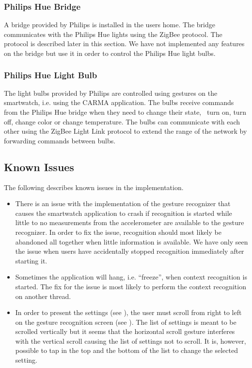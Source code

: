 \subsubsection{Philips Hue Bridge}

A bridge provided by Philips is installed in the users home. The bridge communicates with the Philips Hue lights using the ZigBee protocol. The protocol is described later in this section. We have not implemented any features on the bridge but use it in order to control the Philips Hue light bulbs.

\subsubsection{Philips Hue Light Bulb}

The light bulbs provided by Philips are controlled using gestures on the smartwatch, i.e. using the CARMA application. The bulbs receive commands from the Philips Hue bridge when they need to change their state, \eg~turn on, turn off, change color or change temperature. The bulbs can communicate with each other using the ZigBee Light Link protocol to extend the range of the network by forwarding commands between bulbs.

\subsection{Known Issues}

The following describes known issues in the implementation.

\begin{itemize}
\item There is an issue with the implementation of the gesture recognizer that causes the smartwatch application to crash if recognition is started while little to no measurements from the accelerometer are available to the gesture recognizer. In order to fix the issue, recognition should most likely be abandoned all together when little information is available. We have only seen the issue when users have accidentally stopped recognition immediately after starting it.
\item Sometimes the application will hang, i.e. ``freeze'', when context recognition is started. The fix for the issue is most likely to perform the context recognition on another thread.
\item In order to present the settings (see ), the user must scroll from right to left on the gesture recognition screen (see ). The list of settings is meant to be scrolled vertically but it seems that the horizontal scroll gesture interferes with the vertical scroll causing the list of settings not to scroll. It is, however, possible to tap in the top and the bottom of the list to change the selected setting.
\end{itemize}

